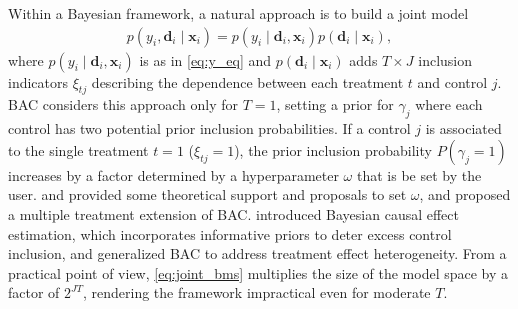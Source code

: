 \documentclass[12pt]{article}
\newcommand{\mb}[1]{\mathbf{#1}}
\newcommand{\bd}{{\mb{d}}}
\newcommand{\bx}{{\mb{x}}}
\newcommand{\bgamma}{{\bm{\gamma}}}
\begin{document}
Within a Bayesian framework, a natural approach is to build a joint model
\begin{align}
p(y_{i}, \bd_{i} \mid \bx_{i}) = p(y_{i} \mid \bd_{i}, \bx_{i}) p(\bd_{i} \mid \bx_{i}),
\label{eq:joint_bms}
\end{align}
where $p(y_i \mid \bd_i, \bx_i)$ is as in \eqref{eq:y_eq} and $p(\bd_i \mid \bx_i)$ adds $T \times J$ inclusion indicators $\xi_{tj}$ describing the dependence between each treatment $t$ and control $j$. 
BAC \citep{Wang12} considers this approach only for $T=1$, setting
a prior for $\gamma_j$ where each control has two potential prior inclusion probabilities. %
If a control $j$ is associated to the single treatment $t=1$ ($\xi_{tj}=1$), the prior inclusion probability $P(\gamma_j=1)$ increases by a factor determined by a hyperparameter $\omega$
that is be set by the user. %
\cite{Lefebvre14} and \cite{Wang15} provided some theoretical support and proposals to set $\omega$,
and \cite{Wilson18} proposed a multiple treatment extension of BAC.
\cite{Talbot15} introduced Bayesian causal effect estimation, which incorporates informative priors to deter excess control inclusion, 
and \cite{Antonelli17} generalized BAC %
to address treatment effect heterogeneity.
From a practical point of view, \eqref{eq:joint_bms} multiplies the size of the model space by a factor of $2^{JT}$, rendering the framework impractical even for moderate $T$.
\end{document}

